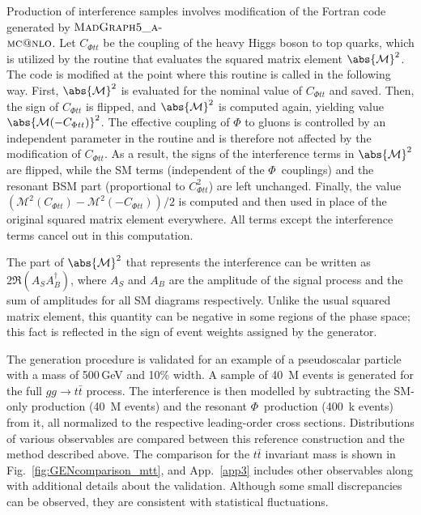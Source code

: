 Production of interference samples involves modification of the Fortran code generated by $\textsc{MadGraph5\_a-}$\\
$\textsc{mc@nlo}$.
Let $C_{\Phi tt}$ be the coupling of the heavy Higgs boson to top quarks, which is utilized by the routine that evaluates the squared matrix element $\abs{\mathcal{M}}^2$.
The code is modified at the point where this routine is called in the following way.
First, $\abs{\mathcal{M}}^2$ is evaluated for the nominal value of $C_{\Phi tt}$ and saved.
Then, the sign of $C_{\Phi tt}$ is flipped, and $\abs{\mathcal{M}}^2$ is computed again, yielding value $\abs{\mathcal{M}(-C_{\Phi tt})}^2$.
The effective coupling of $\Phi$ to gluons is controlled by an independent parameter in the routine and is therefore not affected by the modification of $C_{\Phi tt}$.
As a result, the signs of the interference terms in $\abs{\mathcal{M}}^2$ are flipped, while the SM terms (independent of the $\Phi$~couplings) and the resonant BSM part (proportional to $C_{\Phi tt}^2$) are left unchanged.
Finally, the value $(\mathcal{M}^{2}(C_{\Phi tt}) - \mathcal{M}^{2}(-C_{\Phi tt})) / 2$ is computed and then used in place of the original squared matrix element everywhere.
All terms except the interference terms cancel out in this computation.

The part of $\abs{\mathcal M}^2$ that represents the interference can be written as $2\Re(A_S A_B^\dagger)$, where $A_S$ and $A_B$ are the amplitude of the signal process and the sum of amplitudes for all SM diagrams respectively.
Unlike the usual squared matrix element, this quantity can be negative in some regions of the phase space; this fact is reflected in the sign of event weights assigned by the generator.

The generation procedure is validated for an example of a pseudoscalar particle with a mass of 500\,GeV and 10\% width.
A sample of 40~M events is generated for the full $gg \rightarrow t\bar t$ process.
The interference is then modelled by subtracting the SM-only production (40~M events) and the resonant $\Phi$~production (400~k events) from it, all normalized to the respective leading-order cross sections.
Distributions of various observables are compared between this reference construction and the method described above.
The comparison for the $t\bar t$ invariant mass is shown in Fig.~\ref{fig:GENcomparison_mtt}, and App.~\ref{app3} includes other observables along with additional details about the validation.
Although some small discrepancies can be observed, they are consistent with statistical fluctuations.

